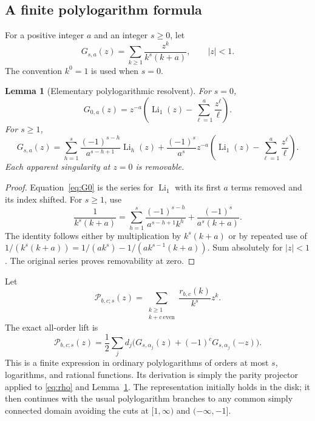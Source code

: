 \documentclass[11pt,letterpaper]{article}
\numberwithin{equation}{section}
\theoremstyle{plain}
\newtheorem{lemma}[theorem]{Lemma}
\theoremstyle{definition}
\theoremstyle{remark}
\DeclareMathOperator{\Li}{Li}\DeclareMathOperator{\FP}{FP}
\begin{document}
\subsection{A finite polylogarithm formula}

For a positive integer $a$ and an integer $s\ge0$, let
\[
 G_{s,a}(z)=\sum_{k\ge1}\frac{z^k}{k^s(k+a)},\qquad |z|<1.
\]
The convention $k^0=1$ is used when $s=0$.

\begin{lemma}[Elementary polylogarithmic resolvent]\label{lem:G}
For $s=0$,
\begin{equation}\label{eq:G0}
 G_{0,a}(z)=z^{-a}\left(\Li_1(z)-\sum_{\ell=1}^{a}\frac{z^\ell}{\ell}\right).
\end{equation}
For $s\ge1$,
\begin{equation}\label{eq:Gs}
 G_{s,a}(z)=\sum_{h=1}^{s}\frac{(-1)^{s-h}}{a^{s-h+1}}\Li_h(z)
 +\frac{(-1)^s}{a^s}z^{-a}
       \left(\Li_1(z)-\sum_{\ell=1}^{a}\frac{z^\ell}{\ell}\right).
\end{equation}
Each apparent singularity at $z=0$ is removable.
\end{lemma}
\begin{proof}
Equation~\eqref{eq:G0} is the series for $\Li_1$ with its first $a$ terms removed and its index shifted. For $s\ge1$, use
\[
 \frac1{k^s(k+a)}=
 \sum_{h=1}^{s}\frac{(-1)^{s-h}}{a^{s-h+1}k^h}
 +\frac{(-1)^s}{a^s(k+a)}.
\]
The identity follows either by multiplication by $k^s(k+a)$ or by repeated use of $1/(k^s(k+a))=1/(ak^s)-1/(ak^{s-1}(k+a))$. Sum absolutely for $|z|<1$. The original series proves removability at zero.
\end{proof}

Let
\begin{equation}\label{eq:Ps}
 \mathcal P_{b,c;s}(z)=
 \sum_{\substack{k\ge1\\k+c\ \mathrm{even}}}
       \frac{r_{b,c}(k)}{k^s}z^k.
\end{equation}
The exact all-order lift is
\begin{equation}\label{eq:polylog-lift}
 \boxed{\displaystyle
 \mathcal P_{b,c;s}(z)=\frac12\sum_jd_j
     \bigl(G_{s,\alpha_j}(z)+(-1)^cG_{s,\alpha_j}(-z)\bigr).}
\end{equation}
This is a finite expression in ordinary polylogarithms of orders at most $s$, logarithms, and rational functions. Its derivation is simply the parity projector applied to \eqref{eq:rho} and Lemma~\ref{lem:G}. The representation initially holds in the disk; it then continues with the usual polylogarithm branches to any common simply connected domain avoiding the cuts at $[1,\infty)$ and $(-\infty,-1]$.
\end{document}
